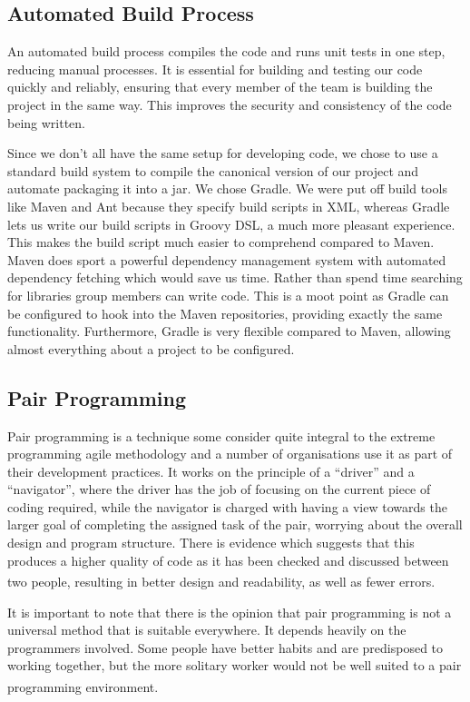 \documentclass[10pt, a4paper]{article}
\begin{document}
\subsection{Automated Build Process}

An automated build process compiles the code and runs unit tests in one step, reducing manual processes. It is essential for building and testing our code quickly and reliably, ensuring that every member of the team is building the project in the same way. This improves the security and consistency of the code being written. 

Since we don’t all have the same setup for developing code, we chose to use a standard build system to compile the canonical version of our project and automate packaging it into a jar. We chose Gradle. We were put off build tools like Maven and Ant because they specify build scripts in XML, whereas Gradle lets us write our build scripts in Groovy DSL, a much more pleasant experience. This makes the build script much easier to comprehend compared to Maven. Maven does sport a powerful dependency management system with automated dependency fetching which would save us time. Rather than spend time searching for libraries group members can write code. This is a moot point as Gradle can be configured to hook into the Maven repositories, providing exactly the same functionality. Furthermore, Gradle is very flexible compared to Maven, allowing almost everything about a project to be configured. 

\subsection{Pair Programming}

Pair programming is a technique some consider quite integral to the extreme programming agile methodology and a number of organisations use it as part of their development practices. It works on the principle of a “driver” and a “navigator”, where the driver has the job of focusing on the current piece of coding required, while the navigator is charged with having a view towards the larger goal of completing the assigned task of the pair, worrying about the overall design and program structure. There is evidence which suggests that this produces a higher quality of code as it has been checked and discussed between two people, resulting in better design and readability, as well as fewer errors\textsuperscript{\cite{pairprog1}}.

It is important to note that there is the opinion that pair programming is not a universal method that is suitable everywhere. It depends heavily on the programmers involved. Some people have better habits and are predisposed to working together, but the more solitary worker would not be well suited to a pair programming environment\textsuperscript{\cite{partswap}}.
\end{document}
